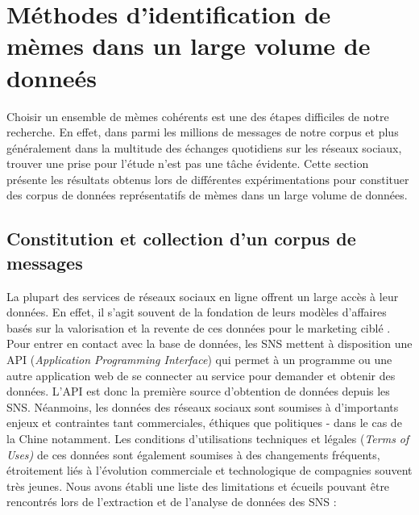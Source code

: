 \section{Méthodes d'identification de mèmes dans un large volume de donneés}
\label{sec:id-meme}

Choisir un ensemble de mèmes cohérents est une des étapes difficiles de notre recherche. En effet, dans parmi les millions de messages de notre corpus et plus généralement dans la multitude des échanges quotidiens sur les réseaux sociaux, trouver une prise pour l{\textquoteright}étude n{\textquoteright}est pas une t\^ache évidente. Cette section présente les résultats obtenus lors de différentes expérimentations pour constituer des corpus de données représentatifs de mèmes dans un large volume de données.

\subsection[Constitution et collection d{\textquoteright}un corpus de messages]{Constitution et collection d{\textquoteright}un corpus de messages}
\label{sec:weiboscope}

La plupart des services de réseaux sociaux en ligne offrent un large accès à leur données. En effet, il s{\textquoteright}agit souvent de la fondation de leurs modèles d{\textquoteright}affaires basés sur la valorisation et la revente de ces données pour le marketing ciblé \citep{Ko2010}. Pour entrer en contact avec la base de données, les SNS mettent à disposition une API (\textit{Application Programming Interface}) qui permet à un programme ou une autre application web de se connecter au service pour demander et obtenir des données. L{\textquoteright}API est donc la première source d{\textquoteright}obtention de données depuis les SNS. Néanmoins, les données des réseaux sociaux sont soumises à d{\textquoteright}importants enjeux et contraintes tant commerciales, éthiques que politiques - dans le cas de la Chine notamment. Les conditions d{\textquoteright}utilisations techniques et légales (\textit{Terms of Uses) }de ces données sont également soumises à des changements fréquents, étroitement liés à l{\textquoteright}évolution commerciale et technologique de compagnies souvent très jeunes. Nous avons établi une liste des limitations et écueils pouvant \^etre rencontrés lors de l{\textquoteright}extraction et de l{\textquoteright}analyse de données des SNS :

